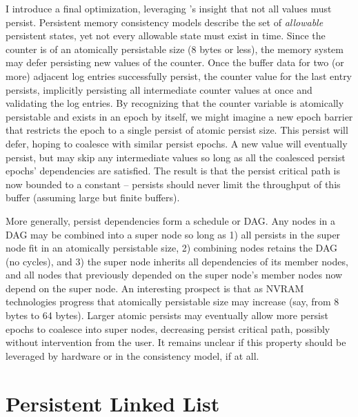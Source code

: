 I introduce a final optimization, leveraging 's insight that not all values must persist.
Persistent memory consistency models describe the set of \emph{allowable} persistent states, yet not every allowable state must exist in time.
Since the counter is of an atomically persistable size (8 bytes or less), the memory system may defer persisting new values of the counter.
Once the buffer data for two (or more) adjacent log entries successfully persist, the counter value for the last entry persists, implicitly persisting all intermediate counter values at once and validating the log entries.
By recognizing that the counter variable is atomically persistable and exists in an epoch by itself, we might imagine a new epoch barrier that restricts the epoch to a single persist of atomic persist size.
This persist will defer, hoping to coalesce with similar persist epochs.
A new value will eventually persist, but may skip any intermediate values so long as all the coalesced persist epochs' dependencies are satisfied.
The result is that the persist critical path is now bounded to a constant -- persists should never limit the throughput of this buffer (assuming large but finite buffers).

More generally, persist dependencies form a schedule or DAG.
Any nodes in a DAG may be combined into a super node so long as 1) all persists in the super node fit in an atomically persistable size, 2) combining nodes retains the DAG (no cycles), and 3) the super node inherits all dependencies of its member nodes, and all nodes that previously depended on the super node's member nodes now depend on the super node.
An interesting prospect is that as NVRAM technologies progress that atomically persistable size may increase (say, from 8 bytes to 64 bytes).
Larger atomic persists may eventually allow more persist epochs to coalesce into super nodes, decreasing persist critical path, possibly without intervention from the user.
It remains unclear if this property should be leveraged by hardware or in the consistency model, if at all.

\section{Persistent Linked List}
\label{sec:PMC_patterns:LinkedList}



